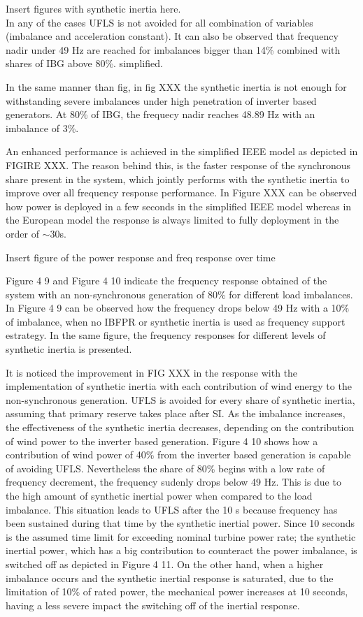 Insert figures with synthetic inertia here.
\\
In any of the cases UFLS is not avoided for all combination of variables (imbalance and acceleration constant). It can also be observed that frequency nadir under 49 Hz are reached for imbalances bigger than 14\% combined with shares of IBG above 80\%. simplified.

In the same manner than fig, in fig XXX the synthetic inertia is not enough for withstanding severe imbalances under high penetration of inverter based generators. At 80\% of IBG, the frequecy nadir reaches 48.89 Hz with an imbalance of 3\%. 

An enhanced performance is achieved in the simplified IEEE model as depicted in FIGIRE XXX. The reason behind this, is the faster response of the synchronous share present in the system, which jointly performs with the synthetic inertia to improve over all frequency response performance. In Figure XXX can be observed how power is deployed in a few seconds in the simplified IEEE model whereas in the European model the response is always limited to fully deployment in the order of $ \sim 30 $s.

Insert figure of the power response and freq response over time

Figure 4 9 and Figure 4 10 indicate the frequency response obtained of the system with an non-synchronous generation of 80\% for different load imbalances.  
In Figure 4 9 can be observed how the frequency drops below 49 Hz with a 10\% of imbalance, when no IBFPR or synthetic inertia is used as frequency support estrategy. In the same figure, the frequency responses for different levels of synthetic inertia is presented. 

It is noticed the improvement in FIG XXX in the response with the implementation of synthetic inertia with each contribution of wind energy to the non-synchronous generation. UFLS is avoided for every share of synthetic inertia, assuming that primary reserve takes place after SI. As the imbalance increases, the effectiveness of the synthetic inertia decreases, depending on the contribution of wind power to the inverter based generation. Figure 4 10 shows how a contribution of wind power of 40\% from the inverter based generation is capable of avoiding UFLS. Nevertheless the share of 80\% begins with a low rate of frequency decrement, the frequency sudenly drops below 49 Hz. This is due to the high amount of synthetic inertial power when compared to the load imbalance. This situation leads to UFLS after the 10 s because frequency has been sustained during that time by the synthetic inertial power. Since 10 seconds is the assumed time limit for exceeding nominal turbine power rate; the synthetic inertial power, which has a big contribution to counteract the power imbalance, is switched off as depicted in Figure 4 11. On the other hand, when a higher imbalance occurs and the synthetic inertial response is saturated, due to the limitation of 10\% of rated power, the mechanical power increases at 10 seconds, having a less severe impact the switching off of the inertial response.



